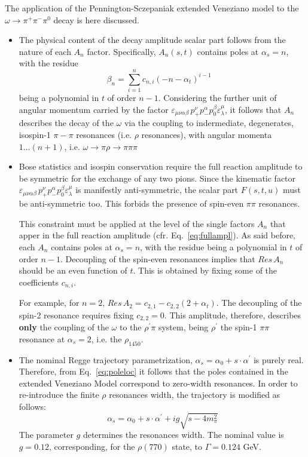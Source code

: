 \documentclass[a4paper,10pt]{report}
\newcommand{\decay}{$\omega \rightarrow \pi^+ \pi^- \pi^0$ }
\begin{document}
The application of the Pennington-Sczepaniak extended Veneziano model to the \decay decay is here discussed.
\begin{itemize}
\item The physical content of the decay amplitude scalar part follows from the nature of each $A_n$ factor. Specifically, $A_n(s,t)$ 
contains poles at $\alpha_s=n$, with the residue
 $$\beta_n=\sum^n_{i=1} c_{n,i} (-n-\alpha_t)^{i-1} \; \; \;$$
being a polynomial in $t$ of order $n-1$.
Considering the further unit of angular momentum carried by the factor $\varepsilon_{\mu \nu \alpha \beta}\, p^{\nu}_{+}p^{\alpha}_{-}p^{\beta}_{0}\varepsilon^{\mu}_{\lambda}$,
it follows that $A_n$ describes the decay of the $\omega$ via the coupling to indermediate, degenerates, isospin-1 $\pi-\pi$ resonances (i.e. $\rho$ resonances),
with angular momenta $1\ldots (n+1)$, i.e. $\omega \rightarrow \pi \rho \rightarrow \pi\pi\pi$


 
\item Bose statistics and isospin conservation require the full reaction amplitude to be symmetric for the exchange of any two pions. Since the kinematic factor
 $\varepsilon_{\mu \nu \alpha \beta}\, p^{\nu}_{+}p^{\alpha}_{-}p^{\beta}_{0}\varepsilon^{\mu}_{\lambda}$ is manifestly anti-symmetric, the scalar part $F(s,t,u)$ must be anti-symmetric too.
This forbids the presence of spin-even $\pi \pi$ resonances.

This constraint must be applied at the level of the single factors $A_n$ that apper in the full reaction amplitude (cfr. Eq.~\ref{eq:fullampl}). 
As said before, each $A_n$ contains poles at $\alpha_s=n$, with the residue being a polynomial in $t$ of order $n-1$.
Decoupling of the spin-even resonances implies that $Res \, A_{n}$ should be an even function of $t$. This is obtained by fixing some of the coefficients $c_{n,i}$.

For example, for $n=2$, $Res \, A_{2}=c_{2,1}-c_{2,2}(2+\alpha_t)$. The decoupling of the spin-2 resonance requires fixing $c_{2,2}=0$. This amplitude, therefore,
describes \textbf{only} the coupling of the $\omega$ to the $\rho^\prime \pi$ system, being $\rho^\prime$ the spin-1 $\pi \pi$ resonance at $\alpha_s=2$, i.e. the $\rho_{1450}$.

\item The nominal Regge trajectory parametrization, $\alpha_s=\alpha_0+s\cdot\alpha^{\prime}$ is purely real. Therefore, from Eq.~\ref{eq:poleloc} it follows that the poles contained in the extended Veneziano Model correspond to zero-width resonances. In order to re-introduce the finite $\rho$ resonances width, the trajectory is modified as follows:
\begin{equation}
\alpha_s=\alpha_0 + s \cdot \alpha^\prime + i g \sqrt{s-4m^2_\pi}
\end{equation}
The parameter $g$ determines the resonances width. The nominal value is $g=0.12$, corresponding, for the $\rho(770)$ state, to $\Gamma=0.124$ GeV.
\end{itemize}
\end{document}
